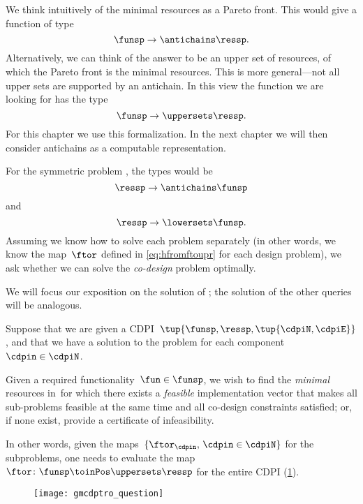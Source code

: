 We think intuitively of the minimal resources as a Pareto front.
This would give a function of type
\begin{equation}
    \funsp \to \antichains\ressp.
\end{equation}
Alternatively, we can think of the answer to be an upper set of resources, of which the Pareto front is the minimal resources.
This is more general---not all upper sets are supported by an antichain.
In this view the function we are looking for has the type
\begin{equation}
    \funsp \to \uppersets\ressp.
\end{equation}
For this chapter we use this formalization.
In the next chapter we will then consider antichains as a computable representation.

For the symmetric problem \FixResMaxFun, the types would be
\begin{equation}
    \ressp \to \antichains\funsp
\end{equation}
and
\begin{equation}
    \ressp \to \lowersets\funsp.
\end{equation}
%
Assuming we know how to solve each problem separately (in other words, we know the map~$\ftor$ defined in \cref{eq:hfromftoupr} for each design problem), we ask whether we can solve the \emph{co-design} problem optimally.

We will focus our exposition on the solution of \FixFunMinRes; the solution of the other queries will be analogous.


\begin{problem}
    \label{prob:MCDP}
    Suppose that we are given a CDPI~$\tup{ \funsp,\ressp,\tup{ \cdpiN,\cdpiE} }$, and that we have a solution to the \FixFunMinRes problem for each component~$\cdpin\in\cdpiN$.
    
    Given a required functionality~$\fun\in\funsp$, we wish to find the \emph{minimal} resources in~\ressp for which there exists a \emph{feasible} implementation vector that makes all sub-problems feasible at the same time and all co-design constraints satisfied; or, if none exist, provide a certificate of infeasibility.
\end{problem}
In other words, given the maps~$\{\ftor_{\cdpin},\,\cdpin\in\cdpiN\}$ for the subproblems, one needs to evaluate  the map~$\ftor\colon\funsp \toinPos \uppersets \ressp$ for the entire CDPI (\cref{fig:question}).

\begin{figure}
    \texttt{[image: gmcdptro\_question]}
    \caption{}
    \label{fig:question}
\end{figure}


